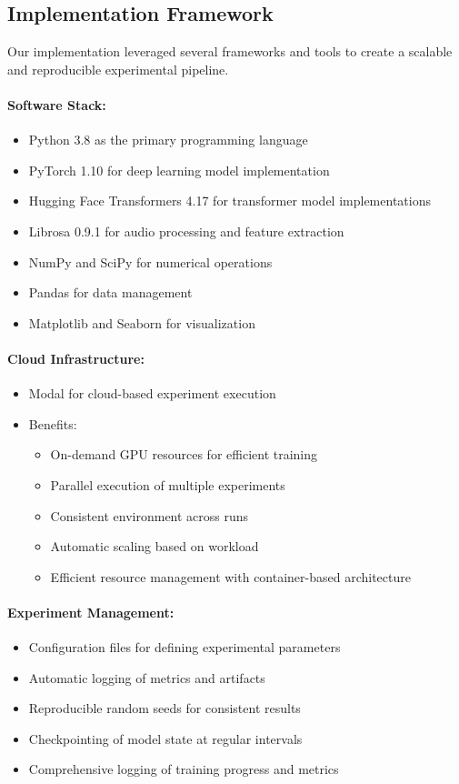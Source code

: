 \documentclass[12pt]{article}
\begin{document}
\subsection{Implementation Framework}
Our implementation leveraged several frameworks and tools to create a scalable and reproducible experimental pipeline.

\paragraph{Software Stack:}
\begin{itemize}
    \item Python 3.8 as the primary programming language
    \item PyTorch 1.10 for deep learning model implementation
    \item Hugging Face Transformers 4.17 for transformer model implementations
    \item Librosa 0.9.1 for audio processing and feature extraction
    \item NumPy and SciPy for numerical operations
    \item Pandas for data management
    \item Matplotlib and Seaborn for visualization
\end{itemize}

\paragraph{Cloud Infrastructure:}
\begin{itemize}
    \item Modal for cloud-based experiment execution
    \item Benefits:
    \begin{itemize}
        \item On-demand GPU resources for efficient training
        \item Parallel execution of multiple experiments
        \item Consistent environment across runs
        \item Automatic scaling based on workload
        \item Efficient resource management with container-based architecture
    \end{itemize}
\end{itemize}

\paragraph{Experiment Management:}
\begin{itemize}
    \item Configuration files for defining experimental parameters
    \item Automatic logging of metrics and artifacts
    \item Reproducible random seeds for consistent results
    \item Checkpointing of model state at regular intervals
    \item Comprehensive logging of training progress and metrics
\end{itemize}
\end{document}
